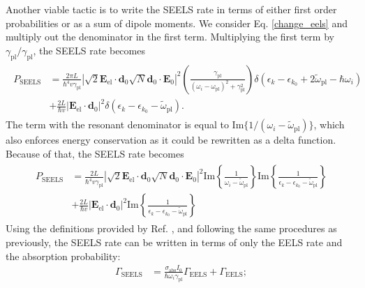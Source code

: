 \documentclass [11pt, proquest] {uwthesis}[2016/11/22]
\begin{document}
Another viable tactic is to write the SEELS rate in terms of either first order probabilities or as a sum of dipole moments. We consider Eq. \ref{change_eels} and multiply out the denominator in the first term. Multiplying the first term by $\gamma_{\textrm{pl}}/\gamma_{\textrm{pl}}$, the SEELS rate becomes
\begin{align}
\begin{split}
  P_{\textrm{SEELS}} &= \frac{2\pi L}{\hbar^4v\gamma_{\textrm{pl}}}\left|\sqrt{2}\textbf{E}_{\textrm{el}}\cdot\textbf{d}_0 \sqrt{N}\textbf{d}_0\cdot\textbf{E}_{0}\right|^2\left(\frac{\gamma_{\textrm{pl}}}{(\omega_i - \omega_{\textrm{pl}})^2 + \gamma_{\textrm{pl}}^2}\right)\delta(\epsilon_k - \epsilon_{k_0} + 2\tilde{\omega}_{\textrm{pl}} - \hbar\omega_i)\\
  &+ \frac{2L}{\hbar v}|\textbf{E}_{\textrm{el}}\cdot\textbf{d}_0|^2\delta(\epsilon_k - \epsilon_{k_0} - \tilde{\omega}_{\textrm{pl}}).
  \label{mult_gamma}
  \end{split}
\end{align}
The term with the resonant denominator is  equal to $\textrm{Im}\{1/(\omega_i - \tilde{\omega}_{\textrm{pl}})\}$, which also enforces energy conservation as it could be rewritten as a delta function. Because of that, the SEELS rate becomes
\begin{align}
\begin{split}
  P_{\textrm{SEELS}} &= \frac{2 L}{\hbar^4v\gamma_{\textrm{pl}}}\left|\sqrt{2}\textbf{E}_{\textrm{el}}\cdot\textbf{d}_0 \sqrt{N}\textbf{d}_0\cdot\textbf{E}_{0}\right|^2\textrm{Im}\left\{\frac{1}{\omega_i - \tilde{\omega}_{\textrm{pl}}}\right\}\textrm{Im}\left\{\frac{1}{\epsilon_k - \epsilon_{k_0} - \tilde{\omega}_{\textrm{pl}}}\right\}\\
  &+ \frac{2L}{\hbar v}|\textbf{E}_{\textrm{el}}\cdot\textbf{d}_0|^2\textrm{Im}\left\{\frac{1}{\epsilon_k - \epsilon_{k_0} - \tilde{\omega}_{\textrm{pl}}}\right\}
  \label{imag}
  \end{split}
\end{align}
Using the definitions provided by Ref. \cite{EEGS}, and following the same procedures as previously, the SEELS rate can be written in terms of only the EELS rate and the absorption probability:
\begin{equation}
\begin{split}
  \Gamma_{\textrm{SEELS}} &= \frac{\sigma_{\textrm{abs}}I_0}{\hbar\omega_i\gamma_{\textrm{pl}}}\Gamma_{\textrm{EELS}} + \Gamma_{\textrm{EELS}};
  \label{seels_rate_first_imag}
  \end{split}
\end{equation}
\end{document}
